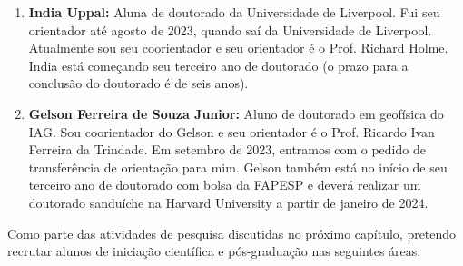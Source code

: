 \documentclass[12pt,a4paper,oneside]{book}
\begin{document}
\begin{enumerate}
  \item \textbf{India Uppal:} Aluna de doutorado da Universidade de Liverpool.
    Fui seu orientador até agosto de 2023, quando saí da Universidade de
    Liverpool. Atualmente sou seu coorientador e seu orientador é o Prof.
    Richard Holme. India está começando seu terceiro ano de doutorado (o prazo
    para a conclusão do doutorado é de seis anos).
  \item \textbf{Gelson Ferreira de Souza Junior:} Aluno de doutorado em
    geofísica do IAG. Sou coorientador do Gelson e seu orientador é o Prof.
    Ricardo Ivan Ferreira da Trindade. Em setembro de 2023, entramos com o
    pedido de transferência de orientação para mim. Gelson também está no
    início de seu terceiro ano de doutorado com bolsa da FAPESP e deverá
    realizar um doutorado sanduíche na Harvard University a partir de
    janeiro de 2024.
\end{enumerate}

Como parte das atividades de pesquisa discutidas no próximo capítulo, pretendo
recrutar alunos de iniciação científica e pós-graduação nas seguintes áreas:
\end{document}
